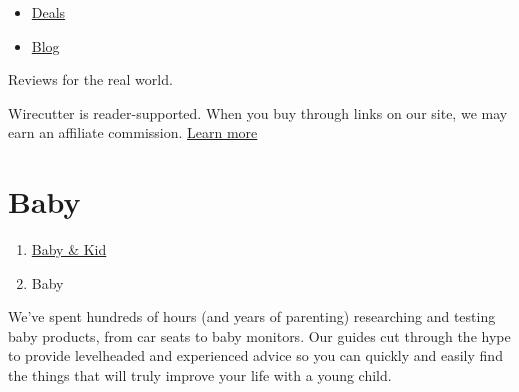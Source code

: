 \begin{itemize}
\tightlist
\item
  \href{/wirecutter/deals/}{Deals}
\item
  \href{/wirecutter/blog/}{Blog}
\end{itemize}

Reviews for the real world.

Wirecutter is reader-supported. When you buy through links on our site,
we may earn an affiliate commission. \href{/wirecutter/about/}{Learn
more}

\hypertarget{baby}{%
\section{Baby}\label{baby}}

\begin{enumerate}
\def\labelenumi{\arabic{enumi}.}
\tightlist
\item
  \href{https://www.nytimes3xbfgragh.onion/wirecutter/baby-kid/}{Baby \&
  Kid}
\item
  Baby
\end{enumerate}

We've spent hundreds of hours (and years of parenting) researching and
testing baby products, from car seats to baby monitors. Our guides cut
through the hype to provide levelheaded and experienced advice so you
can quickly and easily find the things that will truly improve your life
with a young child.

